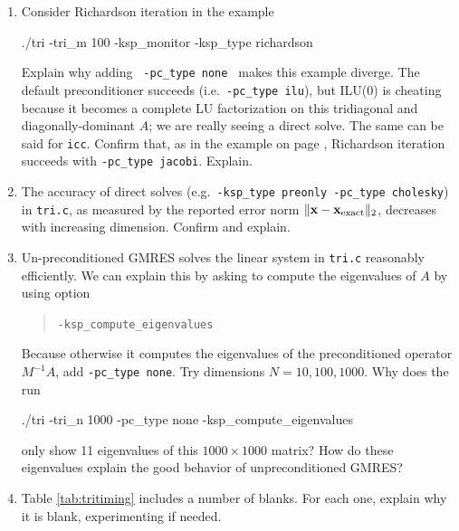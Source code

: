 \begin{enumerate}
\item Consider Richardson iteration in the example
\begin{cline}
./tri -tri_m 100 -ksp_monitor -ksp_type richardson
\end{cline}
Explain why adding \texttt{ -pc\_type none } makes this example diverge.  The default preconditioner succeeds (i.e.~\texttt{-pc\_type ilu}), but ILU($0$) is cheating because it becomes a complete LU factorization on this tridiagonal and diagonally-dominant $A$; we are really seeing a direct solve.  The same can be said for \texttt{icc}.  Confirm that, as in the example on page \pageref{introprerichardson}, Richardson iteration succeeds with \texttt{-pc\_type jacobi}.  Explain.

\item The accuracy of direct solves (e.g.~\texttt{-ksp\_type preonly -pc\_type cholesky}) in \texttt{tri.c}, as measured by the reported error norm $\|\mathbf{x} - \mathbf{x}_{\text{exact}}\|_2$, decreases with increasing dimension.  Confirm and explain.

\item \label{exer:computeeigs} Un-preconditioned GMRES solves the linear system in \texttt{tri.c} reasonably efficiently.  We can explain this by asking \PETSc to compute the eigenvalues of $A$ by using option
\begin{quote}
\texttt{-ksp\_compute\_eigenvalues}
\end{quote}
Because otherwise it computes the eigenvalues of the preconditioned operator $M^{-1}A$, add \texttt{-pc\_type none}.  Try dimensions $N=10,100,1000$.  Why does the  run
\begin{cline}
./tri -tri_n 1000 -pc_type none -ksp_compute_eigenvalues
\end{cline}
only show 11 eigenvalues of this $1000\times 1000$ matrix?  How do these eigenvalues explain the good behavior of unpreconditioned GMRES?

\item Table \ref{tab:tritiming} includes a number of blanks.  For each one, explain why it is blank, experimenting if needed.


\end{enumerate}
